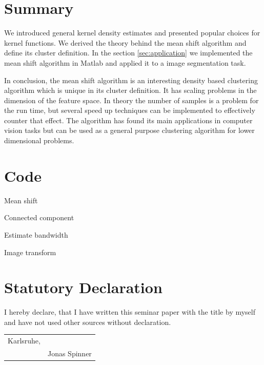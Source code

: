 \documentclass{article}
\begin{document}
\section{Summary}

We introduced general kernel density estimates and presented popular choices for kernel functions. We derived the theory behind the mean shift algorithm and define its cluster definition. In the section \ref{sec:application} we implemented the mean shift algorithm in Matlab and applied it to a image segmentation task.

In conclusion, the mean shift algorithm is an interesting density based clustering algorithm which is unique in its cluster definition. It has scaling problems in the dimension of the feature space. In theory the number of samples is a problem for the run time, but several speed up techniques can be implemented to effectively counter that effect. The algorithm has found its main applications in computer vision tasks but can be used as a general purpose clustering algorithm for lower dimensional problems.


\newpage




\appendix
\section{Code}
\begin{code}
	
	\caption[mean\_shift]{Mean shift}
	\label{code:mean_shift}
\end{code}

\begin{code}
	
	\caption[connected\_component]{Connected component}
	\label{code:connected_component}
\end{code}

\begin{code}
	
	\caption[estimate\_bandwidth]{Estimate bandwidth}
	\label{code:estimate_bandwidth}
\end{code}

\begin{code}
	
	\caption[image\_transform]{Image transform}
	\label{code:image_transform}
\end{code}

\newpage
\section*{Statutory Declaration}

I hereby declare, that I have written this seminar paper with the title \textbf{\thetitle} by myself and have not used other sources without declaration.


\begin{tabular}{@{}p{2in}p{2.5in}@{}}
	Karlsruhe, \thedate & \hrulefill \\
	& Jonas Spinner
\end{tabular}
\end{document}
